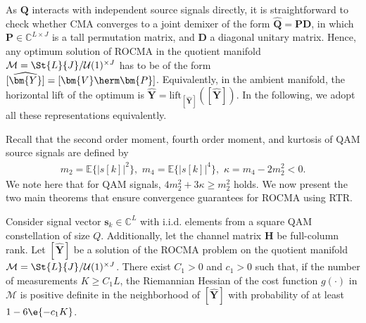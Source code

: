As $\bm{Q}$ interacts with independent source signals directly, 
it is straightforward to check whether CMA converges to 
a joint demixer of the form $\widehat{\bm{Q}}=\bm{P}\bm{D}$, 
in which $\bm{P}\in\mathbb{C}^{L\times J}$ is a tall permutation matrix, 
and $\bm{D}$ a diagonal unitary matrix. 
Hence, any optimum solution of ROCMA in the quotient manifold $\mathcal{M}=\St{L}{J}/\mathcal{U}(1)^{\times J}$ has to be of the form $[\widehat{\bm{Y}}]=[\bm{V}\herm\bm{P}]$. Equivalently, in the ambient manifold, the horizontal lift of the optimum is $\widehat{\bm{Y}}=\mathrm{lift}_{[\widehat{\bm{Y}}]}([\widehat{\bm{Y}}])$. In the following, we adopt all these representations equivalently.

Recall that the second order moment, fourth order moment, and kurtosis of 
QAM source signals are defined \cite{Ding2000} by
\begin{align}
m_2=\mathbb{E}\{|s[k]|^2\}, \,\, m_4=\mathbb{E}\{|s[k]|^4\}, \,\,\kappa=m_4-2 m_2^2<0.\nonumber
\end{align} 
We note here that for QAM signals, $4m_2^2+3\kappa\geq m_2^2$ holds. 
We now present the two main theorems that ensure convergence guarantees for ROCMA using RTR.
\begin{thm}\label{rocma:thm:ROCMA_hess_posdef}
	Consider signal vector $\bm{s}_k\in\mathbb{C}^L$ with i.i.d. elements from a square QAM constellation of size $Q$. Additionally, let the channel matrix $\bm{H}$ be full-column rank.
	Let $[\widehat{\bm{Y}}]$ be a solution of the ROCMA problem on the quotient manifold $\mathcal{M}=\St{L}{J}/\mathcal{U}(1)^{\times J}$. 
	There exist $C_1>0$ and $c_1>0$ %
	such that, if the number of measurements $K\geq C_1 L$, the Riemannian Hessian of the cost function $g(\cdot)$ in $\mathcal{M}$ is positive definite in the neighborhood of $[\widehat{\bm{Y}}]$	with probability of at least $1 -6\e{-c_1K}$.
\end{thm}

